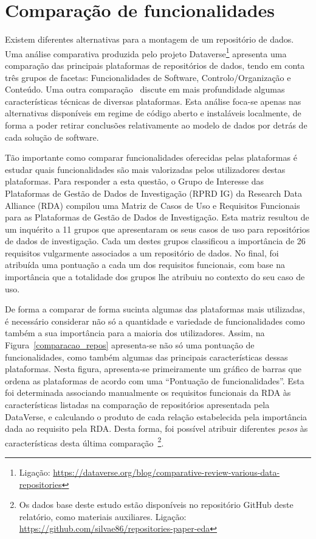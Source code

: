 \documentclass[sigconf,nonacm]{acmart}
\begin{document}


\section{Comparação de funcionalidades} %
\label{sec:comparacao_de_funcionalidades}

Existem diferentes alternativas para a montagem de um repositório de dados. Uma análise comparativa produzida pelo projeto Dataverse\footnote{Ligação:  \url{https://dataverse.org/blog/comparative-review-various-data-repositories}} apresenta uma comparação das principais plataformas de repositórios de dados, tendo em conta três grupos de facetas: Funcionalidades de Software, Controlo/Organização e Conteúdo. Uma outra comparação~\cite{amorimComparison2017} discute em mais profundidade algumas características técnicas de diversas plataformas. Esta análise foca-se apenas nas alternativas disponíveis em regime de código aberto e instaláveis localmente, de forma a poder retirar conclusões relativamente ao modelo de dados por detrás de cada solução de software. 

Tão importante como comparar funcionalidades oferecidas pelas plataformas é estudar quais funcionalidades são mais valorizadas pelos utilizadores destas plataformas. Para responder a esta questão, o Grupo de Interesse das Plataformas de Gestão de Dados de Investigação (RPRD IG) da Research Data Alliance (RDA) compilou uma Matriz de Casos de Uso e Requisitos Funcionais para as Plataformas de Gestão de Dados de Investigação. Esta matriz resultou de um inquérito a 11 grupos que apresentaram os seus casos de uso para repositórios de dados de investigação. Cada um destes grupos classificou a importância de 26 requisitos vulgarmente associados a um repositório de dados. No final, foi atribuída uma pontuação a cada um dos requisitos funcionais, com base na importância que a totalidade dos grupos lhe atribuiu no contexto do seu caso de uso.

De forma a comparar de forma sucinta algumas das plataformas mais utilizadas, é necessário considerar não só a quantidade e variedade de funcionalidades como também a sua importância para a maioria dos utilizadores. Assim, na Figura~\ref{comparacao_repos} apresenta-se não só uma pontuação de funcionalidades, como também algumas das principais características dessas plataformas. Nesta figura, apresenta-se primeiramente um gráfico de barras que ordena as plataformas de acordo com uma ``Pontuação de funcionalidades''. Esta foi determinada associando manualmente os requisitos funcionais da RDA às características listadas na comparação de repositórios apresentada pela DataVerse, e calculando o produto de cada relação estabelecida pela importância dada ao requisito pela RDA. Desta forma, foi possível atribuir diferentes \emph{pesos} às características desta última comparação~\footnote{Os dados base deste estudo estão disponíveis no repositório GitHub deste relatório, como materiais auxiliares. Ligação: \url{https://github.com/silvae86/repositories-paper-eda}}. 
\end{document}
